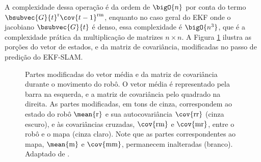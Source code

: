 \renewcommand{\arraystretch}{1.0}
A complexidade dessa operação é da ordem de $\bigO{n}$ por conta do termo $\bsubvec{G}{t}^\mathrm{r} \cov{t-1}^\mathrm{rm}$, enquanto no caso geral do EKF onde o jacobiano $\bsubvec{G}{t}$ é denso, essa complexidade é $\bigO{n^3}$, que é a complexidade prática da multiplicação de matrizes $n \times n$. A Figura 
\ref{fig:ekfslam-prediction} ilustra as porções do vetor de estados, e da 
matriz de covariância, modificadas no passo de predição do EKF-SLAM.

\begin{figure}[h]
  \centering
  
  \caption{Partes modificadas do vetor média e da matriz de covariância durante o movimento do robô. O vetor média é representado pela barra na esquerda, e a matriz de covariância pelo quadrado na direita. As partes modificadas, em tons de cinza, correspondem ao estado do robô $\mean{\mathrm{r}}$  e sua autocovariância $\cov{\mathrm{rr}}$ (cinza escuro), e às covariâncias cruzadas, $\cov{\mathrm{rm}}$ e $\cov{\mathrm{mr}}$, entre o robô e o mapa (cinza claro). Note que as partes correspondentes ao mapa, $\mean{\mathrm{m}}$ e $\cov{\mathrm{mm}}$, 
  permanecem inalteradas (branco). Adaptado de .}
  \label{fig:ekfslam-prediction}
\end{figure}


